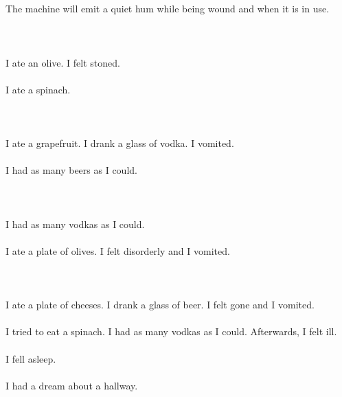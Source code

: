 \documentclass{article}
\begin{document}
    \section{}
    The machine will emit a quiet hum while being wound and when it is in use.\\\\ 
    \newpage
    
    \section{}
    I ate an olive. I felt stoned.\\\\I ate a spinach.\\\\ 
    \newpage
    
    \section{}
    I ate a grapefruit. I drank a glass of vodka. I vomited.\\\\I had as many beers as I could.\\\\ 
    \newpage
    
    \section{}
    I had as many vodkas as I could.\\\\I ate a plate of olives. I felt disorderly and I vomited.\\\\ 
    \newpage
    
    \section{}
    I ate a plate of cheeses. I drank a glass of beer. I felt gone and I vomited.\\\\I tried to eat a spinach. I had as many vodkas as I could. Afterwards, I felt ill.\\\\I fell asleep.\\\\I had a dream about a hallway.\\\\ 
    \newpage
    
\end{document}
